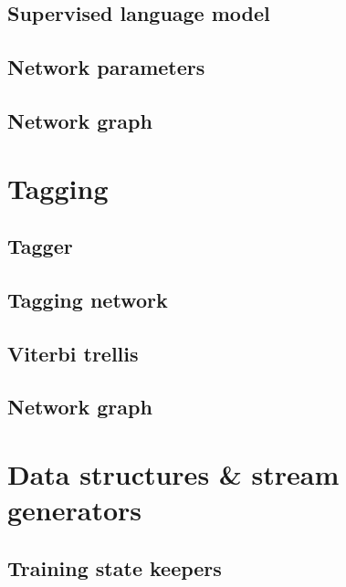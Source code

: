 \subsection{Supervised language model}
\label{sec:langmodel}

\subsection{Network parameters}
\label{sec:nnetworkparams}

\subsection{Network graph}
\label{sec:modelcost}


\section{Tagging}
\subsection{Tagger}
\label{sec:trainer}

\subsection{Tagging network}
\label{sec:langmodel}

\subsection{Viterbi trellis}
\label{sec:modelcost}

\subsection{Network graph}
\label{sec:modelcost}


\section{Data structures \& stream generators}
\subsection{Training state keepers}
\label{sec:trainstate}

